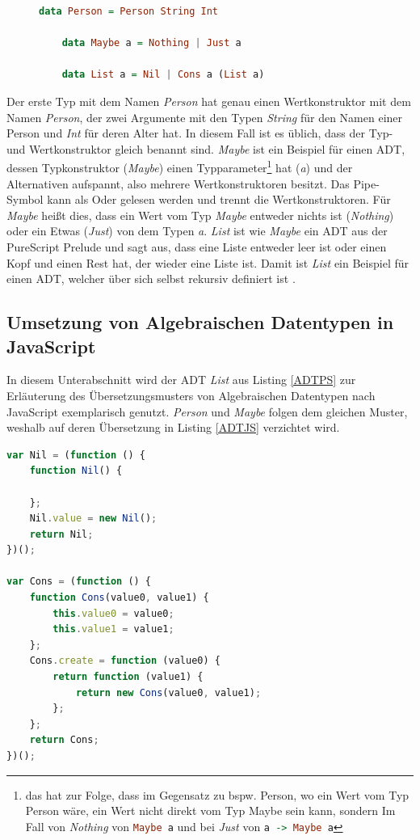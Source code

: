 \documentclass[
12pt,
ngerman,
oneside]
{scrbook} %
\begin{document}
 \begin{figure}
	\begin{lstlisting}[aboveskip=-1em, language=purescript, caption=Beispiel ADT, label=ADTPS]
	data Person = Person String Int
	
	data Maybe a = Nothing | Just a
	
	data List a = Nil | Cons a (List a)
	\end{lstlisting}
\end{figure}

Der erste Typ mit dem Namen \emph{Person} hat genau einen Wertkonstruktor mit dem Namen \emph{Person}, der zwei Argumente mit den Typen \emph{String} für den Namen einer Person und \emph{Int} für deren Alter hat. In diesem Fall ist es üblich, dass der Typ- und Wertkonstruktor gleich benannt sind. \emph{Maybe} ist ein Beispiel für einen ADT, dessen Typkonstruktor (\emph{Maybe}) einen Typparameter\footnote{das hat zur Folge, dass im Gegensatz zu bspw. Person, wo ein Wert vom Typ Person wäre, ein Wert nicht direkt vom Typ Maybe sein kann, sondern Im Fall von \emph{Nothing} von \lstinline[language=purescript, columns=fixed]{Maybe a}  und bei \emph{Just} von \lstinline[language=purescript, columns=fixed]{a -> Maybe a} } hat (\emph{a}) und der Alternativen aufspannt, also mehrere Wertkonstruktoren besitzt. Das Pipe-Symbol kann als Oder gelesen werden und trennt die Wertkonstruktoren. Für \emph{Maybe} heißt dies, dass ein Wert vom Typ \emph{Maybe} entweder nichts ist (\emph{Nothing}) oder ein Etwas (\emph{Just}) von dem Typen \emph{a}. \emph{List} ist wie \emph{Maybe} ein ADT aus der PureScript Prelude und sagt aus, dass eine Liste entweder leer ist oder einen Kopf und einen Rest hat, der wieder eine Liste ist. Damit ist \emph{List} ein Beispiel für einen ADT, welcher über sich selbst rekursiv definiert ist \cite[][S. 57--58]{Freeman17}.

\subsection{Umsetzung von Algebraischen Datentypen  in JavaScript}
In diesem Unterabschnitt wird der ADT \emph{List} aus Listing \ref{ADTPS} zur Erläuterung des Übersetzungsmusters von Algebraischen Datentypen nach JavaScript exemplarisch genutzt. \emph{Person} und \emph{Maybe} folgen dem gleichen Muster, weshalb auf deren Übersetzung in Listing \ref{ADTJS} verzichtet wird.

\begin{lstlisting}[language=javascript, style=numbered-and-boxed, caption= Übersetzung nach JavaScript von ADT's am Beispiel von \emph{List}, label=ADTJS]
var Nil = (function () {
	function Nil() {

	};
	Nil.value = new Nil();
	return Nil;
})();

var Cons = (function () {
	function Cons(value0, value1) {
		this.value0 = value0;
		this.value1 = value1;
	};
	Cons.create = function (value0) {
		return function (value1) {
			return new Cons(value0, value1);
		};
	};
	return Cons;
})();
\end{lstlisting}
\end{document}
